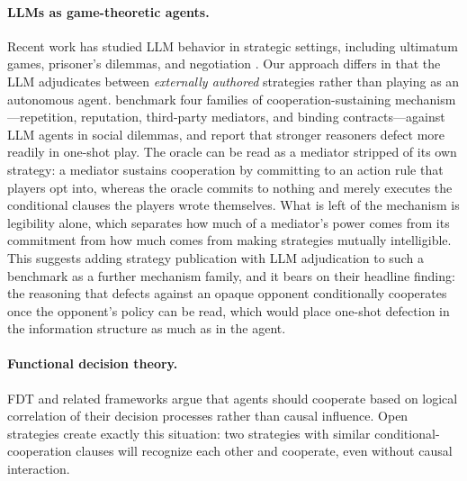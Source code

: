 \documentclass[11pt]{article}
\begin{document}
\paragraph{LLMs as game-theoretic agents.}
Recent work has studied LLM behavior in strategic settings,
including ultimatum games, prisoner's dilemmas, and negotiation
\citep{akata2023playing, brookins2023playing}.
Our approach differs in that the LLM adjudicates between
\emph{externally authored} strategies rather than playing
as an autonomous agent.
\citet{tewolde2026coopeval} benchmark four families of
cooperation-sustaining mechanism---repetition, reputation,
third-party mediators, and binding contracts---against LLM agents in
social dilemmas, and report that stronger reasoners defect more
readily in one-shot play.
The oracle can be read as a mediator stripped of its own strategy: a
mediator sustains cooperation by committing to an action rule that
players opt into, whereas the oracle commits to nothing and merely
executes the conditional clauses the players wrote themselves.
What is left of the mechanism is legibility alone, which separates
how much of a mediator's power comes from its commitment from how
much comes from making strategies mutually intelligible.
This suggests adding strategy publication with LLM adjudication to
such a benchmark as a further mechanism family, and it bears on their
headline finding: the reasoning that defects against an opaque
opponent conditionally cooperates once the opponent's policy can be
read, which would place one-shot defection in the information
structure as much as in the agent.

\paragraph{Functional decision theory.}
FDT \citep{yudkowsky2017functional} and related frameworks argue
that agents should cooperate based on logical correlation of their
decision processes rather than causal influence.
Open strategies create exactly this situation: two strategies with
similar conditional-cooperation clauses will recognize each other
and cooperate, even without causal interaction.
\end{document}
